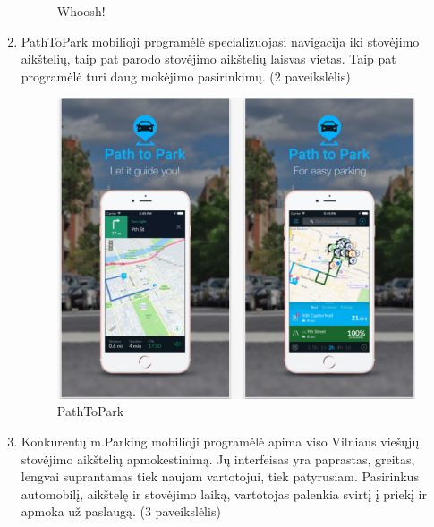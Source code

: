 \documentclass{VUMIFPSkursinis}
\begin{document}
\begin{enumerate}
\begin{samepage}
\begin{figure}[H]
				\caption{Whoosh!}
				\label{img:whoosh}
			\end{figure}
		\end{samepage}
	\newpage
	\item 
		\begin{samepage}
			PathToPark mobilioji programėlė specializuojasi navigacija iki stovėjimo aikštelių, taip pat parodo stovėjimo aikštelių laisvas vietas. Taip pat programėlė turi daug mokėjimo pasirinkimų. (2 paveikslėlis)
			\begin{figure}[H]
				\centering
				\includegraphics[scale=0.4]{img/pathtopark}
				\caption{PathToPark}
				\label{img:pathtopark}
			\end{figure}
		\end{samepage}
	\newpage
	\item
		\begin{samepage}		
			Konkurentų m.Parking mobilioji programėlė apima viso Vilniaus viešųjų stovėjimo aikštelių apmokestinimą. Jų interfeisas yra paprastas, greitas, lengvai suprantamas tiek naujam vartotojui, tiek patyrusiam. Pasirinkus automobilį, aikštelę ir stovėjimo laiką, vartotojas palenkia svirtį į priekį ir apmoka už paslaugą. (3 paveikslėlis)
			\begin{figure}[H]
				\centering

\end{figure}
\end{samepage}
\end{enumerate}
\end{document}
